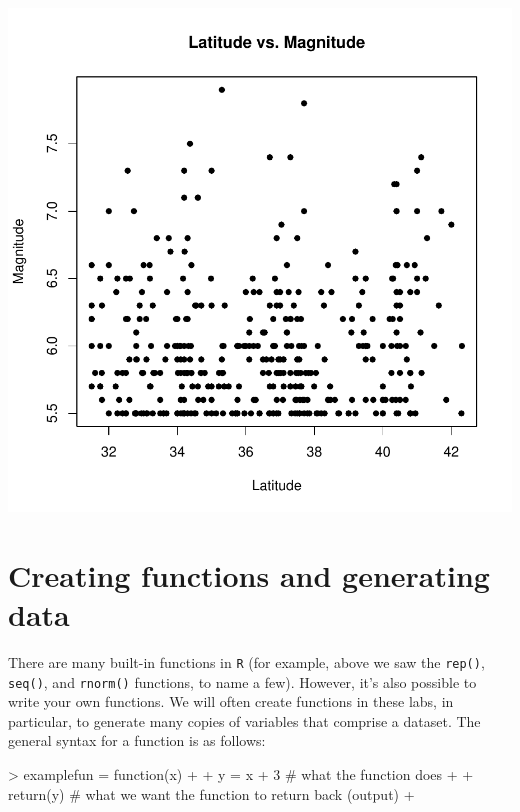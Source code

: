 \documentclass[answers]{exam}
\begin{document}
\begin{solution}
\begin{Schunk}
\end{Schunk}
\includegraphics{RLab0_answers-039}

\end{solution}

\section{Creating functions and generating data}

There are many built-in functions in \texttt{R} (for example, above we saw the \texttt{rep()}, \texttt{seq()}, and \texttt{rnorm()} functions, to name a few). However, it's also possible to write your own functions. We will often create functions in these labs, in particular, to generate many copies of variables that comprise a dataset. The general syntax for a function is as follows:
\begin{Schunk}
\begin{Sinput}
> examplefun = function(x) { 
+   
+   y = x + 3 # what the function does
+   
+   return(y) # what we want the function to return back (output)
+ }
\end{Sinput}
\end{Schunk}
\end{document}
